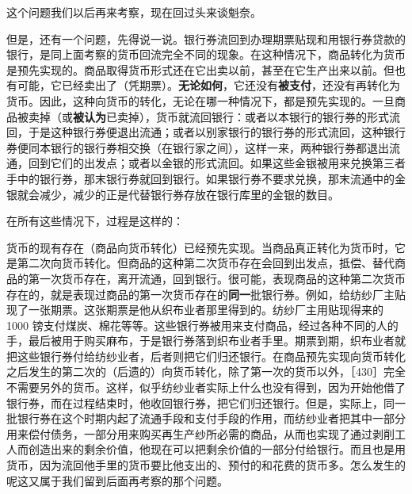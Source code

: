 这个问题我们以后再来考察，现在回过头来谈魁奈。

但是，还有一个问题，先得说一说。银行券流回到办理期票贴现和用银行券贷款的银行，是同上面考察的货币回流完全不同的现象。在这种情况下，商品转化为货币是预先实现的。商品取得货币形式还在它出卖以前，甚至在它生产出来以前。但也有可能，它已经卖出了（凭期票）。\textbf{无论如何}，它还没有\textbf{被支付}，还没有再转化为货币。因此，这种向货币的转化，无论在哪一种情况下，都是预先实现的。一旦商品被卖掉（或\textbf{被认为}已卖掉），货币就流回银行：或者以本银行的银行券的形式流回，于是这种银行券便退出流通；或者以别家银行的银行券的形式流回，这种银行券便同本银行的银行券相交换（在银行家之间），这样一来，两种银行券都退出流通，回到它们的出发点；或者以金银的形式流回。如果这些金银被用来兑换第三者手中的银行券，那末银行券就回到银行。如果银行券不要求兑换，那末流通中的金银就会减少，减少的正是代替银行券存放在银行库里的金银的数目。

在所有这些情况下，过程是这样的：

货币的现有存在（商品向货币转化）已经预先实现。当商品真正转化为货币时，它是第二次向货币转化。但商品的这种第二次货币存在会回到出发点，抵偿、替代商品的第一次货币存在，离开流通，回到银行。很可能，表现商品的这种第二次货币存在的，就是表现过商品的第一次货币存在的\textbf{同一}批银行券。例如，给纺纱厂主贴现了一张期票。这张期票是他从织布业者那里得到的。纺纱厂主用贴现得来的 1000 镑支付煤炭、棉花等等。这些银行券被用来支付商品，经过各种不同的人的手，最后被用于购买麻布，于是银行券落到织布业者手里。期票到期，织布业者就把这些银行券付给纺纱业者，后者则把它们归还银行。在商品预先实现向货币转化之后发生的第二次的（后遗的）向货币转化，除了第一次的货币以外，［430］完全不需要另外的货币。这样，似乎纺纱业者实际上什么也没有得到，因为开始他借了银行券，而在过程结束时，他收回银行券，把它们归还银行。但是，实际上，同一批银行券在这个时期内起了流通手段和支付手段的作用，而纺纱业者把其中一部分用来偿付债务，一部分用来购买再生产纱所必需的商品，从而也实现了通过剥削工人而创造出来的剩余价值，他现在可以把剩余价值的一部分付给银行。而且也是用货币，因为流回他手里的货币要比他支出的、预付的和花费的货币多。怎么发生的呢这又属于我们留到后面再考察的那个问题。


